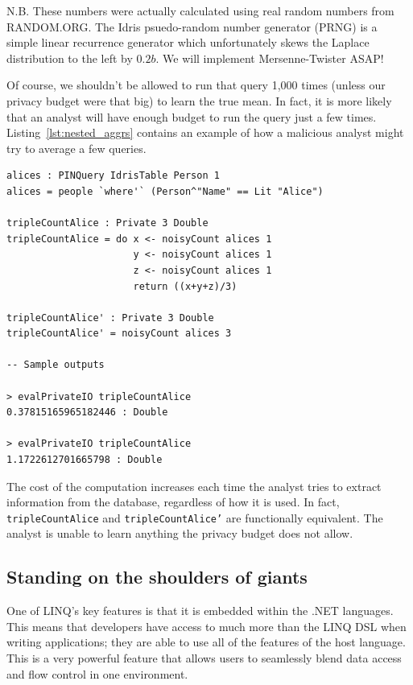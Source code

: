 \documentclass[12pt]{article}
\begin{document}
{\color{red}
  N.B. These numbers were actually calculated using real random numbers from RANDOM.ORG.
  The Idris psuedo-random number generator (PRNG) is a simple linear recurrence generator which unfortunately skews the Laplace distribution to the left by $0.2b$.
  We will implement Mersenne-Twister ASAP!
}

Of course, we shouldn't be allowed to run that query 1,000 times (unless our privacy budget were that big) to learn the true mean.
In fact, it is more likely that an analyst will have enough budget to run the query just a few times.
Listing~\ref{lst:nested_aggrs} contains an example of how a malicious analyst might try to average a few queries.

\begin{lstlisting}[caption={Counting Alices (revisited)},label={lst:nested_aggrs}]
alices : PINQuery IdrisTable Person 1
alices = people `where'` (Person^"Name" == Lit "Alice")

tripleCountAlice : Private 3 Double
tripleCountAlice = do x <- noisyCount alices 1
                      y <- noisyCount alices 1
                      z <- noisyCount alices 1
                      return ((x+y+z)/3)

tripleCountAlice' : Private 3 Double
tripleCountAlice' = noisyCount alices 3

-- Sample outputs

> evalPrivateIO tripleCountAlice
0.37815165965182446 : Double

> evalPrivateIO tripleCountAlice
1.1722612701665798 : Double
\end{lstlisting}

The cost of the computation increases each time the analyst tries to extract information from the database, regardless of how it is used.
In fact, \texttt{tripleCountAlice} and \texttt{tripleCountAlice'} are functionally equivalent.
The analyst is unable to learn anything the privacy budget does not allow.


\subsection{Standing on the shoulders of giants}


One of LINQ's key features is that it is embedded within the .NET languages.
This means that developers have access to much more than the LINQ DSL when writing applications; they are able to use all of the features of the host language.
This is a very powerful feature that allows users to seamlessly blend data access and flow control in one environment.
\end{document}

